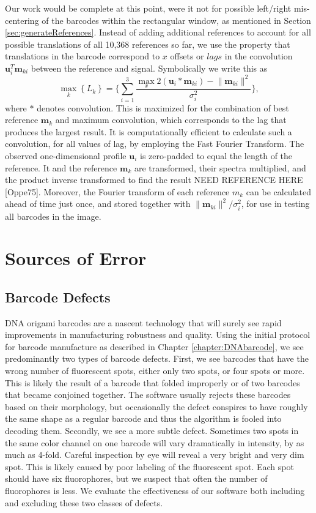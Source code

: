 Our work would be complete at this point, were it not for possible left/right mis-centering of the barcodes within the rectangular window, as mentioned in  Section \ref{sec:generateReferences}. Instead of adding  additional references to account for all possible translations of all 10,368 references so far, we use the property that translations in the barcode correspond to $x$ offsets or $lags$ in the convolution $\mathbf{u}_i ^T \mathbf{m}_{ki}$ between the reference and signal. Symbolically we write this as 
\begin{equation}
\max_k   \left\{ L_k \right\}  =  \Bigg\{ \sum_{i=1}^3 \frac{  \max_{x} 2 (\mathbf{u}_i * \mathbf{m}_{ki}) - \lVert \mathbf{m}_{ki} \rVert^2   }{\sigma_i^2}  
\Bigg\},
\end{equation}
where $*$ denotes convolution. This is maximized for the combination of best reference $\mathbf{m}_k$ and maximum convolution, which corresponds to the lag that produces the largest result.  It is computationally efficient to calculate such a convolution, for all values of lag, by employing the Fast Fourier Transform. The observed one-dimensional profile $\mathbf{u}_i$ is zero-padded to equal the length of the reference. It and the reference $\mathbf{m}_k$ are transformed, their spectra multiplied, and the product inverse transformed to find the result NEED REFERENCE HERE [Oppe75]. Moreover, the Fourier transform of each reference $m_k$ can be calculated ahead of time just once, and stored together with $\lVert \mathbf{m}_{ki} \rVert^2 / \sigma_i^2$, for use in testing all barcodes in the image.  


\section{Sources of Error}

\subsection{Barcode Defects}
DNA origami barcodes are a nascent technology that will surely see rapid improvements in manufacturing robustness and quality. Using the initial protocol for barcode manufacture as described in Chapter \ref{chapter:DNAbarcode}, we see predominantly two types of barcode defects. First, we see barcodes that have the wrong number of fluorescent spots, either only two spots, or four spots or more. This is likely the result of a barcode that folded improperly or of two barcodes that became conjoined together. The software usually rejects these barcodes based on their morphology, but occasionally the defect conspires to have roughly the same shape as a regular barcode and thus the algorithm is fooled into decoding them. Secondly, we see a more subtle defect. Sometimes two spots in the same color channel on one barcode will vary dramatically in intensity, by as much as 4-fold. Careful inspection by eye will reveal a very bright and very dim spot. This is likely caused by poor labeling of the fluorescent spot. Each spot should have six fluorophores, but we suspect that often the number of fluorophores is less. We evaluate the effectiveness of our software both including and excluding these two classes of defects.    


